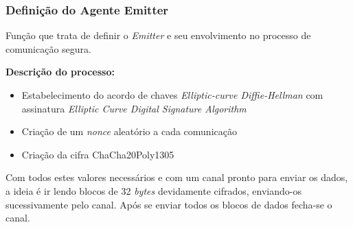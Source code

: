 \documentclass[12pt]{report}
\providecommand{\tightlist}{%
      \setlength{\itemsep}{0pt}\setlength{\parskip}{0pt}}
\begin{document}
    \hypertarget{definiuxe7uxe3o-do-agente-emitter}{%
\subsubsection{Definição do Agente
Emitter}\label{definiuxe7uxe3o-do-agente-emitter}}

Função que trata de definir o \emph{Emitter} e seu envolvimento no
processo de comunicação segura.

\textbf{Descrição do processo:}

\begin{itemize}
\tightlist
\item
  Estabelecimento do acordo de chaves \emph{Elliptic-curve
  Diffie-Hellman} com assinatura \emph{Elliptic Curve Digital Signature
  Algorithm}
\item
  Criação de um \emph{nonce} aleatório a cada comunicação
\item
  Criação da cifra ChaCha20Poly1305
\end{itemize}

Com todos estes valores necessários e com um canal pronto para enviar os
dados, a ideia é ir lendo blocos de 32 \emph{bytes} devidamente
cifrados, enviando-os sucessivamente pelo canal. Após se enviar todos os
blocos de dados fecha-se o canal.
\end{document}
